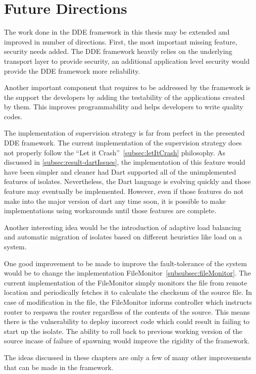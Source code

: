\chapter{Future Directions}\label{chapter:future_directions}

  The work done in the DDE framework in this thesis may be extended and improved in number of directions. First, the most important missing feature, security needs added. The DDE framework heavily relies on the underlying transport layer to provide security, an additional application level security would provide the DDE framework more reliability.

  Another important component that requires to be addressed by the framework is the support the developers by adding the testability of the applications created by them. This improves programmability and helps developers to write quality codes.

  The implementation of supervision strategy is far from perfect in the presented DDE framework. The current implementation of the supervision strategy does not properly follow the “Let it Crash”~\autoref{subsec:letItCrash} philosophy. As discussed in \autoref{subsec:result-dartIssues}, the implementation of this feature would have been simpler and cleaner had Dart supported  all of the unimplemented features of isolates. Nevertheless, the Dart language is evolving quickly and those feature may eventually be implemented. However, even if those features do not make into the major version of dart any time soon, it is possible to make implementations using workarounds until those features are complete.

  Another interesting idea would be the introduction of adaptive load balancing and automatic migration of isolates based on different heuristics like load on a system.

  One good improvement to be made to improve the fault-tolerance of the system would be to change the implementation FileMonitor~\autoref{subsubsec:fileMonitor}. The current implementation of the FileMonitor simply monitors the file from remote location and periodically fetches it to calculate the checksum of the source file. In case of modification in the file, the FileMonitor informs controller which instructs router to respawn the router regardless of the contents of the source. This means there is the vulnerability to deploy incorrect code which could result in failing to start up the isolate. The ability to roll back to previous working version of the source incase of failure of spawning would improve the rigidity of the framework.

  The ideas discussed in these chapters are only a few of many other improvements that can be made in the framework.
